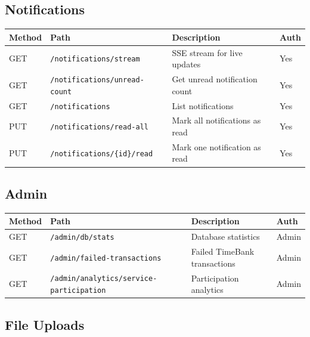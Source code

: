 \documentclass[10pt,a4paper]{report}
\begin{document}
\subsection{Notifications}

\begin{longtable}{|l|p{4.5cm}|p{5cm}|l|}
    \hline
    \textbf{Method} & \textbf{Path}                               & \textbf{Description}           & \textbf{Auth} \\
    \hline
    \endhead
    GET             & \texttt{/notifications/stream}              & SSE stream for live updates    & Yes           \\
    \hline
    GET             & \texttt{/notifications/unread-count}        & Get unread notification count  & Yes           \\
    \hline
    GET             & \texttt{/notifications}                     & List notifications             & Yes           \\
    \hline
    PUT             & \texttt{/notifications/read-all}            & Mark all notifications as read & Yes           \\
    \hline
    PUT             & \texttt{/notifications/\{id\}/read}         & Mark one notification as read  & Yes           \\
    \hline
\end{longtable}

\subsection{Admin}

\begin{longtable}{|l|p{4.5cm}|p{5cm}|l|}
    \hline
    \textbf{Method} & \textbf{Path}                                      & \textbf{Description}           & \textbf{Auth} \\
    \hline
    \endhead
    GET             & \texttt{/admin/db/stats}                           & Database statistics            & Admin         \\
    \hline
    GET             & \texttt{/admin/failed-transactions}                & Failed TimeBank transactions   & Admin         \\
    \hline
    GET             & \texttt{/admin/analytics/service-participation}    & Participation analytics        & Admin         \\
    \hline
\end{longtable}

\subsection{File Uploads}
\end{document}
